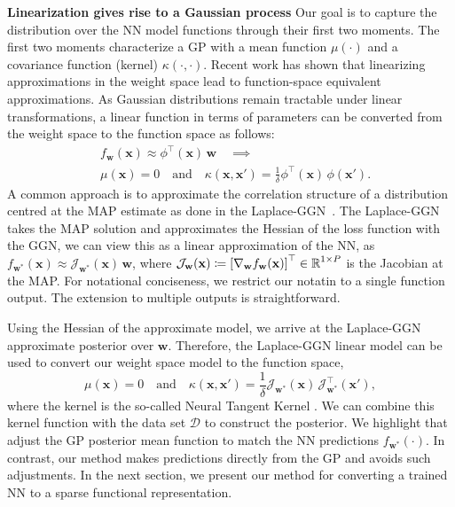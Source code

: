 \documentclass{article}
\newcommand{\dataset}{\ensuremath{\mathcal{D}}}
\newcommand{\weights}{\ensuremath{\mathbf{w}}}
\newcommand{\mbf}[1]{\mathbf{#1}}
\newcommand{\T}{\top}
\newcommand{\vx}{\mbf{x}}
\newcommand{\vw}{\mbf{w}}
\newcommand{\Jac}[2]{\mathcal{J}_{#1}(#2)}
\newcommand{\JacT}[2]{\mathcal{J}_{#1}^\top(#2)}
\newcommand{\GP}{\mathcal{GP}}
\begin{document}
\textbf{Linearization gives rise to a Gaussian process}
Our goal is to capture the distribution over the NN model functions through their first two moments. The first two moments characterize a GP with a mean function $\mu(\cdot)$ and a covariance function (kernel) $\kappa(\cdot,\cdot)$.
Recent work \citep{khan2019approximate,maddox2021fast} has shown that linearizing approximations in the weight space lead to function-space equivalent approximations.
As Gaussian distributions remain tractable under linear transformations, a linear function in terms of parameters can be converted from the weight space to the function space \citep[see Ch.~2.1 in ][]{rasmussen2006gaussian} as follows:
%
\begin{align} \label{eq:weight_func}
 &f_\weights(\vx) \approx
 \phi^\top\!(\vx) \, \vw \quad\implies \nonumber \\
 &\mu(\vx) = 0 \quad \text{and} \quad \kappa(\vx, \vx') = \frac{1}{\delta} \phi^\T\!(\vx) \, \phi(\vx').
\end{align}
A common approach is to approximate the correlation structure of a distribution centred at the MAP estimate as done in the Laplace-GGN~\citep{khan2019approximate, daxberger2021laplace, maddox2021fast}.
The Laplace-GGN takes the MAP solution and approximates the Hessian of the loss function
with the GGN, we can view this as a linear approximation of the NN, as $f_{\weights^*}(\vx) \approx
\Jac{\weights^*}{\vx} \, \weights$, where $\Jac{\weights}{\vx} \coloneqq \left[ \nabla_\weights f_\weights(\vx)\right]^\top \in \R^{1 \times P}$ is the Jacobian at the MAP.
For notational conciseness, we %
restrict our notatin to a single function output. The extension to multiple outputs is straightforward.

Using the Hessian of the approximate model, we arrive at the Laplace-GGN approximate posterior over $\vw$.
Therefore, the Laplace-GGN linear model can be used to convert our weight space model to the function space,
\begin{equation}
\label{eq-laplace-approx-function-space}
  \mu(\vx) =  0 \quad \text{and} \quad
  \kappa(\vx, \vx')
  = \frac{1}{\delta} \Jac{\weights^*}{\vx} \, \JacT{\weights^*}{\vx'},
\end{equation}
where the kernel is the so-called Neural Tangent Kernel \citep[NTK,][]{jacot2018neural}.
We can combine this kernel function with the data set $\dataset$ to construct the posterior.
%
We highlight that  \citet{immer2021improving}  adjust the GP posterior mean function to match the NN predictions $f_{\vw^*}(\cdot)$. In contrast, our method makes predictions directly from the GP and avoids such adjustments. In the next section, we present our method for converting a trained NN to a sparse functional representation.
\end{document}
